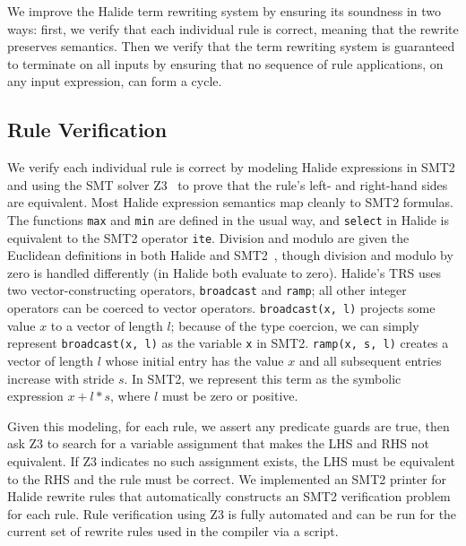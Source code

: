 \documentclass[acmsmall,review]{acmart}\settopmatter{printfolios=true,printccs=false,printacmref=false}
\begin{document}
We improve the Halide term rewriting system by ensuring its soundness in
two ways: first, we verify that each individual rule is correct, meaning that the
rewrite preserves semantics. Then we verify that the term rewriting system is
guaranteed to terminate on all inputs by ensuring that no sequence of
rule applications, on any input expression, can form a cycle.

\subsection{Rule Verification}
\label{sec:verification}
We verify each individual rule is correct by modeling Halide
expressions in SMT2 and using the SMT solver Z3~\cite{de2008z3} to
prove that the rule's left- and right-hand sides are equivalent. Most Halide expression
semantics map cleanly to SMT2 formulas. The functions \texttt{max} and
\texttt{min} are defined in the usual way, and \texttt{select} in
Halide is equivalent to the SMT2 operator \texttt{ite}. Division and
modulo are given the Euclidean definitions in both Halide and
SMT2~\cite{boute1992euclidean}, though division and modulo by zero is handled
differently (in Halide both evaluate to zero).
Halide's TRS uses two vector-constructing operators, \texttt{broadcast} and \texttt{ramp}; all
other integer operators can be coerced to vector operators. 
\texttt{broadcast(x, l)} projects some value $x$ to a vector of length $l$; because of
the type coercion, we can simply represent \texttt{broadcast(x, l)} as the variable
\texttt{x} in SMT2. \texttt{ramp(x, s, l)} creates a vector of length $l$
whose initial entry has the value $x$ and all subsequent entries increase with
stride $s$. In SMT2, we represent this term as the symbolic expression $x + l *
s$, where $l$ must be zero or positive.

Given this modeling, for each rule, we assert any predicate guards are true, then
ask Z3 to search for a variable assignment that makes the LHS and RHS not
equivalent.  If Z3 indicates no such assignment exists, the LHS must be equivalent to
the RHS and the rule must be correct. We implemented an SMT2 printer for 
Halide rewrite rules that automatically constructs an SMT2 verification problem for each rule.
Rule verification using Z3 is fully automated
and can be run for the current set of rewrite rules used in the compiler via a script.
\end{document}
